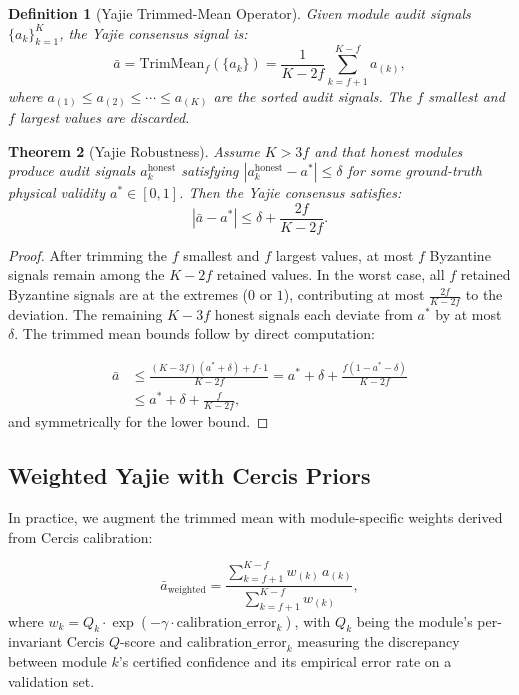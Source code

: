 \documentclass[11pt,twocolumn]{article}
\newtheorem{theorem}{Theorem}[section]
\newtheorem{definition}[theorem]{Definition}
\theoremstyle{definition}
\begin{document}
\begin{definition}[Yajie Trimmed-Mean Operator]
Given module audit signals $\{a_k\}_{k=1}^K$, the Yajie consensus signal is:
\begin{equation}\label{eq:yajie}
  \bar{a} = \text{TrimMean}_f(\{a_k\}) =
  \frac{1}{K - 2f}
  \sum_{k=f+1}^{K-f} a_{(k)},
\end{equation}
where $a_{(1)} \le a_{(2)} \le \cdots \le a_{(K)}$ are the sorted audit
signals.  The $f$ smallest and $f$ largest values are discarded.
\end{definition}

\begin{theorem}[Yajie Robustness]
\label{thm:yajie}
Assume $K > 3f$ and that honest modules produce audit signals
$a_k^{\text{honest}}$ satisfying $|a_k^{\text{honest}} - a^*| \le \delta$ for
some ground-truth physical validity $a^* \in [0,1]$.  Then the Yajie
consensus satisfies:
\begin{equation}
  |\bar{a} - a^*| \le \delta + \frac{2f}{K-2f}.
\end{equation}
\end{theorem}

\begin{proof}
After trimming the $f$ smallest and $f$ largest values, at most $f$ Byzantine
signals remain among the $K-2f$ retained values.  In the worst case, all $f$
retained Byzantine signals are at the extremes ($0$ or $1$), contributing at
most $\frac{2f}{K-2f}$ to the deviation.  The remaining $K-3f$ honest signals
each deviate from $a^*$ by at most $\delta$.  The trimmed mean bounds follow
by direct computation:

\begin{align}
  \bar{a} &\le \frac{(K-3f)(a^* + \delta) + f \cdot 1}{K-2f}
            = a^* + \delta + \frac{f(1 - a^* - \delta)}{K-2f} \\
          &\le a^* + \delta + \frac{f}{K-2f},
\end{align}
and symmetrically for the lower bound.
\end{proof}

\subsection{Weighted Yajie with Cercis Priors}

In practice, we augment the trimmed mean with module-specific weights derived
from Cercis calibration:

\begin{equation}
  \bar{a}_{\text{weighted}} =
  \frac{\sum_{k=f+1}^{K-f} w_{(k)} \, a_{(k)}}
       {\sum_{k=f+1}^{K-f} w_{(k)}},
\end{equation}
where $w_k = Q_k \cdot \exp(-\gamma \cdot \text{calibration\_error}_k)$,
with $Q_k$ being the module's per-invariant Cercis $Q$-score and
$\text{calibration\_error}_k$ measuring the discrepancy between module $k$'s
certified confidence and its empirical error rate on a validation set.
\end{document}
